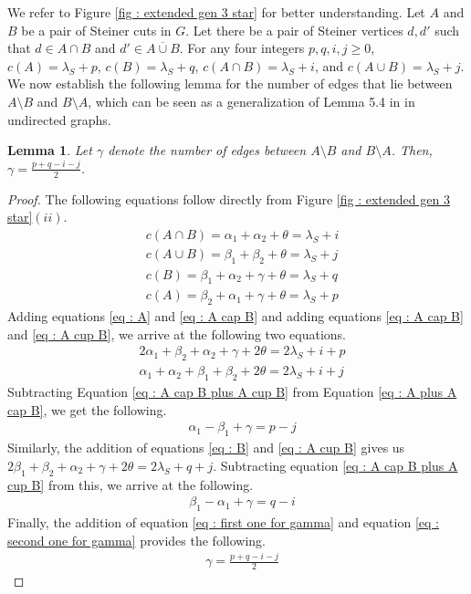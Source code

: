 \documentclass[letterpaper,11pt]{article}
\newtheorem{lemma}{Lemma}[]
\begin{document}
We refer to Figure \ref{fig : extended gen 3 star} for better understanding. Let $A$ and $B$ be a pair of Steiner cuts in $G$. Let there be a pair of Steiner vertices $d,d'$ such that $d\in A\cap B$ and $d'\in \overline{A\cup B}$. For any four integers $p,q,i,j\ge 0$,  $c(A)=\lambda_S+p$, $c(B)=\lambda_S+q$, $c(A\cap B)=\lambda_S+i$, and $c(A\cup B)=\lambda_S+j$. We now establish the following lemma for the number of edges that lie between $A\setminus B$ and $B\setminus A$, which can be seen as a generalization of Lemma 5.4 in \cite{DBLP:journals/talg/BaswanaBP23} in undirected graphs.
\begin{lemma} \label{lem : gamma value}
 Let $\gamma$ denote the number of edges between $A\setminus B$ and $B\setminus A$. Then, $\gamma=\frac{p+q-i-j}{2}$.
\end{lemma}
\begin{proof}
    The following equations follow directly from Figure \ref{fig : extended gen 3 star}$(ii)$.
    \begin{align}
    & c(A\cap B)= \alpha_1+\alpha_2+\theta=\lambda_S+i  \label{eq : A cap B} \\
    & c(A\cup B)= \beta_1+\beta_2+\theta=\lambda_S+j\label{eq : A cup B} \\
    & c(B)=\beta_1+\alpha_2+\gamma+\theta=\lambda_S+q \label{eq : B} \\
    & c(A)= \beta_2+\alpha_1+\gamma+\theta=\lambda_S+p \label{eq : A} 
\end{align}
Adding equations \ref{eq : A} and \ref{eq : A cap B} and adding equations \ref{eq : A cap B} and \ref{eq : A cup B}, we arrive at the following two equations. 
    \begin{align}
    & 2\alpha_1+\beta_2+\alpha_2+\gamma+2\theta=2\lambda_S+i+p \label{eq : A plus A cap B} \\
    & \alpha_1+\alpha_2+\beta_1+\beta_2+2\theta=2\lambda_S+i+j \label{eq : A cap B plus A cup B}
\end{align}
Subtracting Equation \ref{eq : A cap B plus A cup B} from Equation \ref{eq : A plus A cap B}, we get the following. 
   \begin{align}
    & \alpha_1-\beta_1+\gamma=p-j
    \label{eq : first one for gamma}
\end{align}
Similarly, the addition of equations \ref{eq : B} and \ref{eq : A cup B} gives us $2\beta_1+\beta_2+\alpha_2+\gamma+2\theta=2\lambda_S+q+j$. Subtracting equation \ref{eq : A cap B plus A cup B} from this, we arrive at the following. 
   \begin{align}
    & \beta_1-\alpha_1+\gamma=q-i \label{eq : second one for gamma}
\end{align}
Finally, the addition of equation \ref{eq : first one for gamma} and equation \ref{eq : second one for gamma} provides the following.
   \begin{align}
    & \gamma=\frac{p+q-i-j}{2} \label{eq : gamma}
\end{align}
\end{proof}
\end{document}
